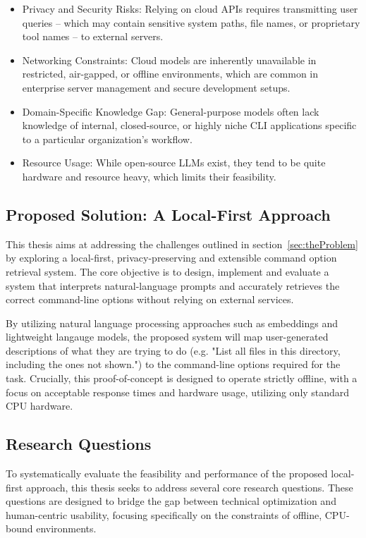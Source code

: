 \begin{itemize}
    \item Privacy and Security Risks: Relying on cloud APIs requires transmitting user queries -- which may contain sensitive system paths, file names, or proprietary tool names -- to external servers.
    \item Networking Constraints: Cloud models are inherently unavailable in restricted, air-gapped, or offline environments, which are common in enterprise server management and secure development setups.
    \item Domain-Specific Knowledge Gap: General-purpose models often lack knowledge of internal, closed-source, or highly niche CLI applications specific to a particular organization's workflow.
    \item Resource Usage: While open-source \acp{LLM} exist, they tend to be quite hardware and resource heavy, which limits their feasibility.
\end{itemize}

    
\subsection{Proposed Solution: A Local-First Approach}

This thesis aims at addressing the challenges outlined in section~\ref{sec:theProblem} by exploring a local-first, privacy-preserving and extensible command option retrieval system. The core objective is to design, implement and evaluate a system that interprets natural-language prompts and accurately retrieves the correct command-line options without relying on external services.

By utilizing natural language processing approaches such as embeddings and lightweight langauge models, the proposed system will map user-generated descriptions of what they are trying to do (e.g. "List all files in this directory, including the ones not shown.") to the command-line options required for the task. Crucially, this proof-of-concept is designed to operate strictly offline, with a focus on acceptable response times and hardware usage, utilizing only standard CPU hardware.

\subsection{Research Questions}

To systematically evaluate the feasibility and performance of the proposed local-first approach, this thesis seeks to address several core research questions. These questions are designed to bridge the gap between technical optimization and human-centric usability, focusing specifically on the constraints of offline, CPU-bound environments. 

